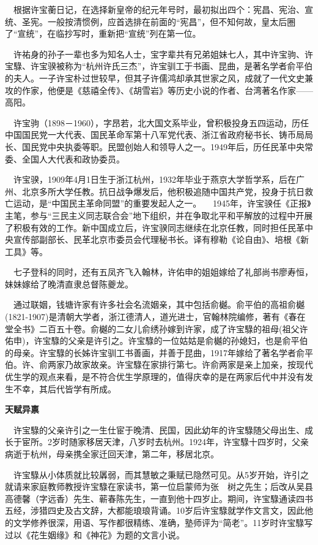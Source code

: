 $\quad$根据许宝蘅日记，在选择新皇帝的纪元年号时，最初拟出四个：宪昌、宪治、宣统、圣宪。一般按清惯例，应首选排在前面的“宪昌”，但不知何故，皇太后圈了“宣统”，在临抄写时，重新把“宣统”列在第一位。	

$\quad$许祐身的孙子一辈也多为知名人士，宝字辈共有兄弟姐妹七人，其中许宝驹、许宝騄、许宝骙被称为“杭州许氏三杰”，许宝驯工于书画、昆曲，是著名学者俞平伯的夫人。一子许宝朴过世较早，但其子许儒鸿却承其世家之风，成就了一代文史兼攻的作家，他便是《慈禧全传》、《胡雪岩》等历史小说的作者、台湾著名作家——高阳。

$\quad$许宝驹（1898－1960），字昂若，北大国文系毕业，曾积极投身五四运动，历任中国国民党一大代表、国民革命军第十八军党代表、浙江省政府秘书长、铸币局局长、国民党中央执委等职。民盟创始人和领导人之一。1949年后，历任民革中央常委、全国人大代表和政协委员。

$\quad$许宝骙，1909年4月1日生于浙江杭州，1932年毕业于燕京大学哲学系，后在广州、北京多所大学任教。抗日战争爆发后，他积极追随中国共产党，投身于抗日救亡运动，是“中国民主革命同盟”的重要发起人之一。
$\quad$1945年，许宝骙任《正报》主笔，参与“三民主义同志联合会”地下组织，并在争取北平和平解放的过程中开展了积极有效的工作。新中国成立后，许宝骙同志继续在北京任教，同时担任民革中央宣传部副部长、民革北京市委员会代理秘书长。译有穆勒《论自由》、培根《新工具》等。

$\quad$七子登科的同时，还有五凤齐飞入翰林，许佑申的姐姐嫁给了礼部尚书廖寿恒，妹妹嫁给了晚清直隶总督陈夔龙。

$\quad$通过联姻，钱塘许家有许多社会名流姻亲，其中包括俞樾。俞平伯的高祖俞樾(1821-1907)是清朝大学者，浙江德清人，道光进士，官翰林院编修，著有《春在堂全书》二百五十卷。俞樾的二女儿俞绣孙嫁到许家，成了许宝騄的祖母(祖父许佑申)，许宝騄的父亲是许引之。许宝騄的一位姑姑是俞樾的孙媳妇，也是俞平伯的母亲。许宝騄的长姊许宝驯工书善画，并善于昆曲，1917年嫁给了著名学者俞平伯。许、俞两家乃故家故亲。许宝騄在家排行第七。许俞两家是亲上加亲，按现代优生学的观点来看，是不符合优生学原理的，值得庆幸的是在两家后代中并没有发生不幸，其后代皆学有所成。

\textbf{天赋异禀}

$\quad$许宝騄的父亲许引之一生仕宦于晚清、民国，因此幼年的许宝騄随父母出生、成长于宦所。2岁时随家移居天津，八岁时去杭州。1924年，许宝騄十四岁时，父亲病逝于杭州，母亲携全家迁回天津，第二年，移居北京。

$\quad$许宝騄从小体质就比较羼弱，而其慧敏之秉赋已隐然可见。从5岁开始，许引之就请来家庭教师教授许宝騄在家读书，第一位启蒙师为张　树之先生；后改从吴县高德馨（字远香）先生、蕲春陈先生，一直到他十四岁止。期间，许宝騄通读四书五经，涉猎四史及古文辞，大都能琅琅背诵。10岁后许宝騄就学作文言文，因此他的文学修养很深，用语、写作都很精练、准确，塾师评为“简老”。11岁时许宝騄写过以《花生姻缘》和《神花》为题的文言小说。

